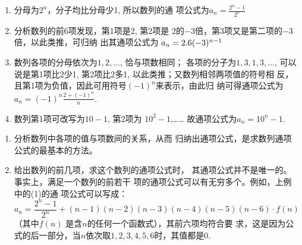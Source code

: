 \begin{solution}
\begin{enumerate}[(1)]
    \item 分母为$2^n$，分子均比分母少1, 所以数列的通
    项公式为$a_n=\frac{2^n-1}{2^n}$
    \item 分析数列的前6项发现，第1项是2, 第2项是
    2的$-3$倍，第3项又是第二项的$-3$倍，以此类推，可归纳
    出其通项公式为
    $a_n=2.6(-3)^{n-1}$
    \item 数列各项的分母依次为$1,2,\ldots$, 恰与项数相同；
    各项的分子为$1,3,1,3,\ldots$, 可以说是第1项比2少1,
    第2项比2多1, 以此类推；又数列相邻两项值的符号相
    反，且第1项为负值，因此可用符号$(-1)^n$来表示，由此归
    纳可得通项公式为
    $a_n=(-1)^{n}\frac{2+(-1)^n}{n}$.
    \item 数列第1项可改写为$10-1$, 第2项为
    $10^2-1$,……
    故通项公式为$a_n=10^n-1$.
\end{enumerate}
\end{solution}

\begin{rmk}
\begin{enumerate}[(1)]
    \item  分析数列中各项的值与项数间的关系，从而
    归纳出通项公式，是求数列通项公式的最基本的方法。
    \item 给出数列的前几项，求这个数列的通项公式时，
    其通项公式并不是唯一的。事实上，满足一个数列的前若干
    项的通项公式可以有无穷多个。例如，上例中的(1)的通
    项公式可以写成：
\[a_n=\frac{2^n-1}{2^n}+(n-1)(n-2)(n-3)(n-4)(n-5)(n-6)\cdot f(n)\]
（其中$f(n)$
是含$n$的任何一个函数式），其前六项均符合要
求，这是因为公式的后一部分，当$n$依次取$1,2,3,4,5,
6$时，其值都是0.
\end{enumerate}
\end{rmk}

